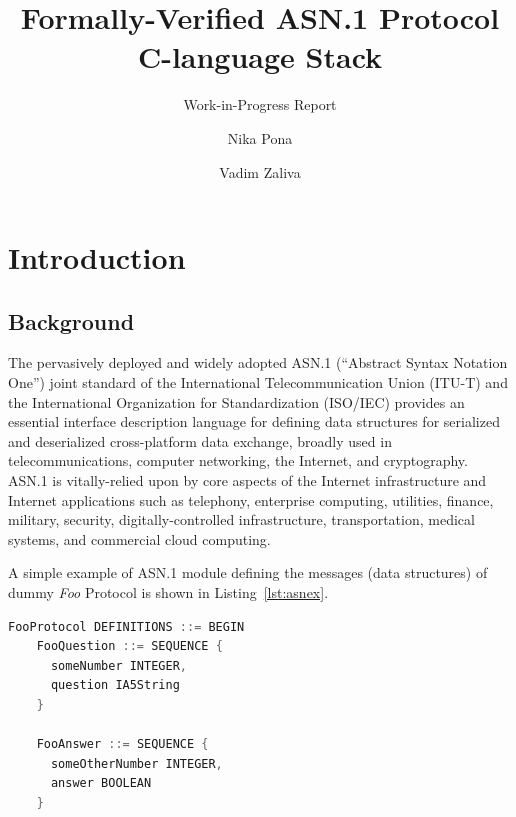 \documentclass[acmsmall,nonacm]{acmart}
\begin{document}
\title{Formally-Verified ASN.1 Protocol C-language Stack}
\subtitle{Work-in-Progress Report}

\author{Nika Pona}
\author{Vadim Zaliva}

\begin{abstract}

\end{abstract}

\maketitle

\tableofcontents

\section{Introduction}

\subsection{Background}

The pervasively deployed and widely adopted ASN.1 (``Abstract Syntax
Notation One'') \cite{TODO} joint standard of the International
Telecommunication Union (ITU-T) and the International Organization for
Standardization (ISO/IEC) provides an essential interface description
language for defining data structures for serialized and deserialized
cross-platform data exchange, broadly used in telecommunications,
computer networking, the Internet, and cryptography. ASN.1 is
vitally-relied upon by core aspects of the Internet infrastructure and
Internet applications such as telephony, enterprise computing,
utilities, finance, military, security, digitally-controlled
infrastructure, transportation, medical systems, and commercial cloud
computing.

A simple example of ASN.1 module defining the messages (data
structures) of dummy \textit{Foo} Protocol is shown in
Listing~\ref{lst:asnex}.

\begin{lstlisting}[language=C,label=lst:asnex,
  caption={ASN.1 example}]  
    FooProtocol DEFINITIONS ::= BEGIN
    FooQuestion ::= SEQUENCE {
      someNumber INTEGER,
      question IA5String
    }
    
    FooAnswer ::= SEQUENCE {
      someOtherNumber INTEGER,
      answer BOOLEAN
    }
\end{lstlisting}
\end{document}
